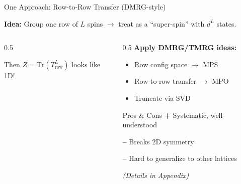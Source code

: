 \documentclass[aspectratio=169, 11pt]{beamer}
\begin{document}
\begin{frame}{One Approach: Row-to-Row Transfer (DMRG-style)}
    
    \textbf{Idea:} Group one row of $L$ spins $\to$ treat as a ``super-spin'' with $d^L$ states.
    
    \vspace{0.3cm}
    
    \begin{columns}
        \begin{column}{0.5\textwidth}
            \begin{center}
            \end{center}
            
            Then $Z = \text{Tr}(T_{\text{row}}^L)$ looks like 1D!
        \end{column}
        
        \begin{column}{0.5\textwidth}
            \textbf{Apply DMRG/TMRG ideas:}
            \begin{itemize}
                \item Row config space $\to$ MPS
                \item Row-to-row transfer $\to$ MPO
                \item Truncate via SVD
            \end{itemize}
            
            \vspace{0.3cm}
            
            \begin{block}{Pros \& Cons}
                \textcolor{accentgreen}{\textbf{+}} Systematic, well-understood
                
                \textcolor{accentred}{\textbf{--}} Breaks 2D symmetry
                
                \textcolor{accentred}{\textbf{--}} Hard to generalize to other lattices
            \end{block}
            
            \vspace{0.2cm}
            
            \textit{(Details in Appendix)}
        \end{column}
    \end{columns}
\end{frame}
\end{document}
